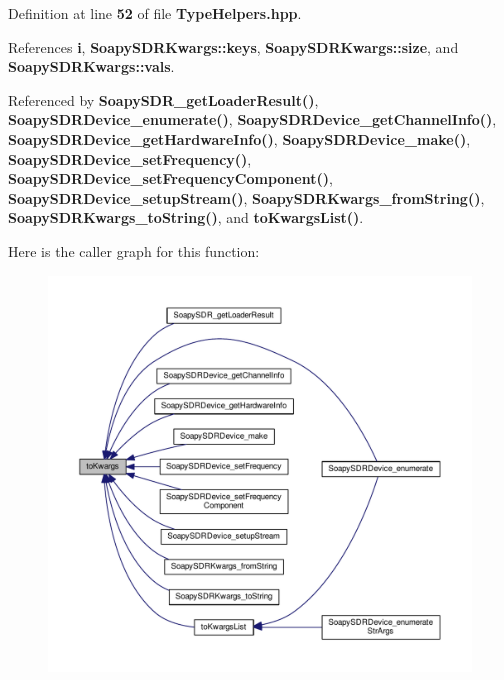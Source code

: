 Definition at line {\bf 52} of file {\bf Type\+Helpers.\+hpp}.



References {\bf i}, {\bf Soapy\+S\+D\+R\+Kwargs\+::keys}, {\bf Soapy\+S\+D\+R\+Kwargs\+::size}, and {\bf Soapy\+S\+D\+R\+Kwargs\+::vals}.



Referenced by {\bf Soapy\+S\+D\+R\+\_\+get\+Loader\+Result()}, {\bf Soapy\+S\+D\+R\+Device\+\_\+enumerate()}, {\bf Soapy\+S\+D\+R\+Device\+\_\+get\+Channel\+Info()}, {\bf Soapy\+S\+D\+R\+Device\+\_\+get\+Hardware\+Info()}, {\bf Soapy\+S\+D\+R\+Device\+\_\+make()}, {\bf Soapy\+S\+D\+R\+Device\+\_\+set\+Frequency()}, {\bf Soapy\+S\+D\+R\+Device\+\_\+set\+Frequency\+Component()}, {\bf Soapy\+S\+D\+R\+Device\+\_\+setup\+Stream()}, {\bf Soapy\+S\+D\+R\+Kwargs\+\_\+from\+String()}, {\bf Soapy\+S\+D\+R\+Kwargs\+\_\+to\+String()}, and {\bf to\+Kwargs\+List()}.



Here is the caller graph for this function\+:
\nopagebreak
\begin{figure}[H]
\begin{center}
\leavevmode
\includegraphics[width=350pt]{d9/dec/TypeHelpers_8hpp_a3a0640d32e647357a49a5be03b1f0d3c_icgraph}
\end{center}
\end{figure}


